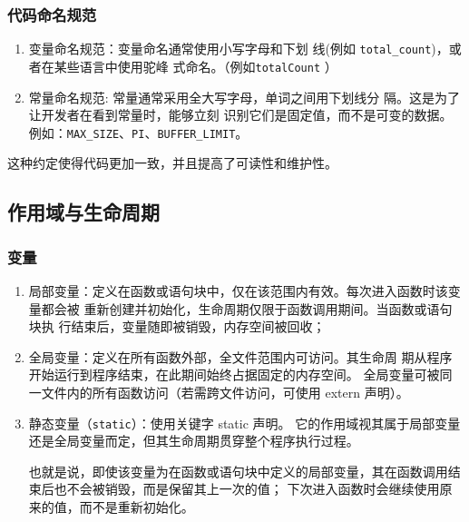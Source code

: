 \subsubsection{代码命名规范}

\begin{enumerate}[label={（\arabic*）}] %
  \item 变量命名规范：变量命名通常使用小写字母和下划
  线(例如 \texttt{total\_count})，或者在某些语言中使用驼峰
  式命名。（例如\texttt{totalCount} ）
  \item 常量命名规范:
  常量通常采用全大写字母，单词之间用下划线分
  隔。这是为了让开发者在看到常量时，能够立刻
  识别它们是固定值，而不是可变的数据。
  例如：\texttt{MAX\_SIZE}、\texttt{PI}、\texttt{BUFFER\_LIMIT}。  
\end{enumerate}


  这种约定使得代码更加一致，并且提高了可读性和维护性。


\vspace{1em}%
\noindent
\subsection{作用域与生命周期}

\subsubsection{变量}

\begin{enumerate}[label={（\arabic*）}] %
  \item 局部变量：定义在函数或语句块中，仅在该范围内有效。每次进入函数时该变量都会被
    重新创建并初始化，生命周期仅限于函数调用期间。当函数或语句块执
    行结束后，变量随即被销毁，内存空间被回收；
  \item 全局变量：定义在所有函数外部，全文件范围内可访问。其生命周
    期从程序开始运行到程序结束，在此期间始终占据固定的内存空间。
    全局变量可被同一文件内的所有函数访问（若需跨文件访问，可使用 extern 声明）。
  \item 静态变量（\texttt{static}）：使用关键字 static 声明。
它的作用域视其属于局部变量还是全局变量而定，但其生命周期贯穿整个程序执行过程。


也就是说，即使该变量为在函数或语句块中定义的局部变量，其在函数调用结束后也不会被销毁，而是保留其上一次的值；
下次进入函数时会继续使用原来的值，而不是重新初始化。
\end{enumerate}
\clearpage


